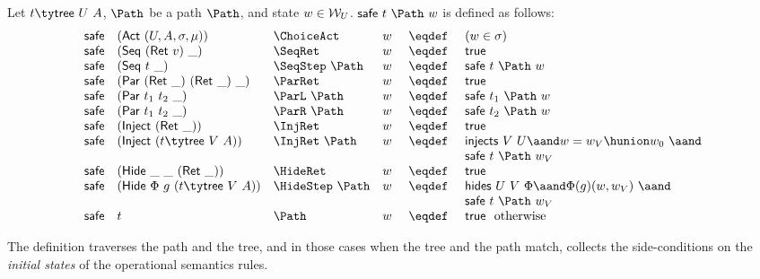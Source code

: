 \begin{definition}
\label{def:safe}
Let $t \ty \mathsf{tree}~U~A$, $\Path$ be a path $\Path$, and state $w
\in {\cal W}_U$.  $\mathsf{safe}~t~\Path~w$ is defined as follows:
\[
\begin{array}{rlllcl}
  \mathsf{safe} & (\mathsf{Act}~(U, A, \sigma, \mu)) & \ChoiceAct & w 
  & ~\eqdef~ & (w \in \sigma) 
  \\
  \mathsf{safe} & (\mathsf{Seq}~(\mathsf{Ret}~v)~\_) & \SeqRet & w 
  & ~\eqdef~ & \mathsf{true}  
  \\
  \mathsf{safe} & (\mathsf{Seq}~t~\_) & \SeqStep~\Path & w 
  & ~\eqdef~ & \mathsf{safe}~t~\Path~w  
  \\
  \mathsf{safe} & (\mathsf{Par}~(\mathsf{Ret}~\_)~(\mathsf{Ret}~\_)~\_) &\ParRet & w 
  & ~\eqdef~ & \mathsf{true}  
  \\
  \mathsf{safe} & (\mathsf{Par}~t_1~t_2~\_) & \ParL~\Path~ & w 
  & ~\eqdef~ & \mathsf{safe}~t_1~\Path~w
  \\
  \mathsf{safe} & (\mathsf{Par}~t_1~t_2~\_) & \ParR~\Path~ & w 
  & ~\eqdef~ & \mathsf{safe}~t_2~\Path~w
  \\
  \mathsf{safe} & (\mathsf{Inject}~(\mathsf{Ret}~\_)) & \InjRet & w 
  & ~\eqdef~ & \mathsf{true}
  \\
  \mathsf{safe} & (\mathsf{Inject}~(t \ty \mathsf{tree}~V~A)) & \InjRet~\Path & w 
  & ~\eqdef~ & \mathsf{injects}~V~U  \aand w = w_V \hunion w_0 ~\aand \\ 
  &&&&& \mathsf{safe}~t~\Path~w_V
  \\
  \mathsf{safe} & (\mathsf{Hide}~\_~\_~(\mathsf{Ret}~\_)) & \HideRet & w 
  & ~\eqdef~ & \mathsf{true}
  \\
  \mathsf{safe} & (\mathsf{Hide}~\Phi~g~(t \ty \mathsf{tree}~V~A)) & \HideStep~\Path & w 
  & ~\eqdef~ & \mathsf{hides}~U~V~\Phi \aand \Phi(g)(w, w_V) ~\aand \\
  &&&&& \mathsf{safe}~t~\Path~w_V
  \\
  \mathsf{safe} & t & \Path & w 
  & ~\eqdef~ & \mathsf{true}  \text{~~otherwise}
\end{array}
\]

\end{definition}

The definition traverses the path and the tree, and in those cases
when the tree and the path match, collects the side-conditions on the
\emph{initial states} of the operational semantics rules.

